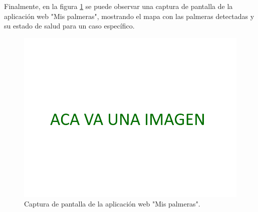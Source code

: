 Finalmente, en la figura \ref{fig:app-web} se puede observar una captura de pantalla de la aplicación web "Mis palmeras", mostrando el mapa con las palmeras detectadas y su estado de salud para un caso específico.

\begin{figure}[H]
  \centering
  \includegraphics[scale=0.2]{./Figures/place-holder.png}
  \caption{Captura de pantalla de la aplicación web "Mis palmeras".}
  \label{fig:app-web}
\end{figure}
